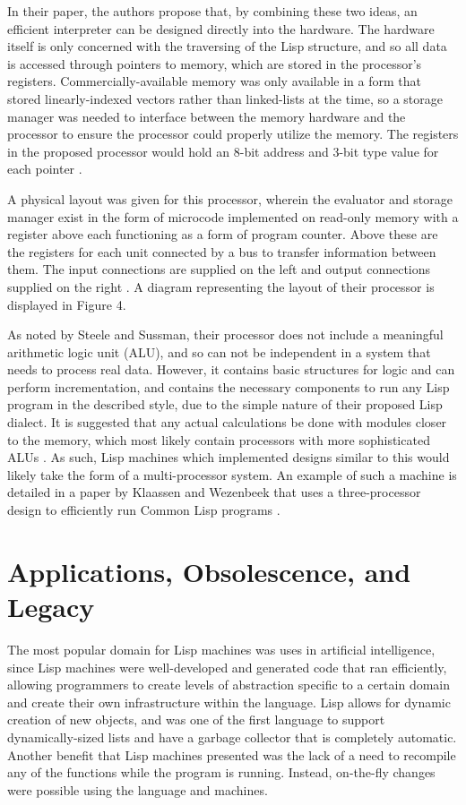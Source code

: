\documentclass[journal]{IEEEtran}
\begin{document}
In their paper, the authors propose that, by combining these two ideas, an efficient interpreter can be designed directly into the hardware. The hardware itself is only concerned with the traversing of the Lisp structure, and so all data is accessed through pointers to memory, which are stored in the processor's registers. Commercially-available memory was only available in a form that stored linearly-indexed vectors rather than linked-lists at the time, so a storage manager was needed to interface between the memory hardware and the processor to ensure the processor could properly utilize the memory. The registers in the proposed processor would hold an 8-bit address and 3-bit type value for each pointer \cite{ss}.

A physical layout was given for this processor, wherein the evaluator and storage manager exist in the form of microcode implemented on read-only memory with a register above each functioning as a form of program counter. Above these are the registers for each unit connected by a bus to transfer information between them. The input connections are supplied on the left and output connections supplied on the right \cite{ss}. A diagram representing the layout of their processor is displayed in Figure 4.

As noted by Steele and Sussman, their processor does not include a meaningful arithmetic logic unit (ALU), and so can not be independent in a system that needs to process real data. However, it contains basic structures for logic and can perform incrementation, and contains the necessary components to run any Lisp program in the described style, due to the simple nature of their proposed Lisp dialect. It is suggested that any actual calculations be done with modules closer to the memory, which most likely contain processors with more sophisticated ALUs \cite{ss}. As such, Lisp machines which implemented designs similar to this would likely take the form of a multi-processor system. An example of such a machine is detailed in a paper by Klaassen and Wezenbeek that uses a three-processor design to efficiently run Common Lisp programs \cite{kw}.

\section{Applications, Obsolescence, and Legacy}
The most popular domain for Lisp machines was uses in artificial intelligence, since Lisp machines were well-developed and generated code that ran efficiently, allowing programmers to create levels of abstraction specific to a certain domain and create their own infrastructure within the language. Lisp allows for dynamic creation of new objects, and was one of the first language to support dynamically-sized lists and have a garbage collector that is completely automatic. Another benefit that Lisp machines presented was the lack of a need to recompile any of the functions while the program is running. Instead, on-the-fly changes were possible using the language and machines.
\end{document}
